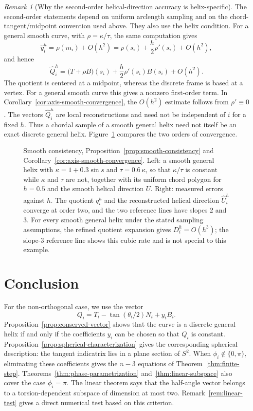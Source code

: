 \documentclass[10pt,a4paper]{amsart}
\theoremstyle{definition}
\theoremstyle{remark}
\newtheorem{remark}[theorem]{Remark}
\numberwithin{equation}{section}
\begin{document}
\begin{remark}[Why the second-order helical-direction accuracy is helix-specific]\label{rem:axis-order}
The second-order statements depend on uniform arclength sampling and on
the chord-tangent/midpoint convention used above. They also use the helix condition. For a general smooth curve, with $\rho=\kappa/\tau$, the same computation gives
\[
\widehat y_i^h=\rho(m_i)+O(h^2)
=\rho(s_i)+\frac h2\rho'(s_i)+O(h^2),
\]
and hence
\[
\widehat Q_i^h
=\bigl(T+\rho B\bigr)(s_i)
+\frac h2\rho'(s_i)B(s_i)+O(h^2).
\]
The quotient is centered at a midpoint, whereas the discrete frame is based at a vertex. For a general smooth curve this gives a nonzero first-order term. In Corollary~\ref{cor:axis-smooth-convergence}, the $O(h^2)$ estimate follows from $\rho'\equiv0$. The vectors $\widehat Q_i^h$ are local reconstructions and need not be independent of $i$ for a fixed $h$. Thus a chordal sample of a smooth general helix need not itself be an exact discrete general helix. Figure~\ref{fig:smooth-consistency} compares the two orders of convergence.
\end{remark}

\begin{figure}[!ht]
\centering
\resizebox{0.98\textwidth}{!}{}
\caption{Smooth consistency, Proposition~\ref{prop:smooth-consistency} and Corollary~\ref{cor:axis-smooth-convergence}. Left: a smooth general helix with $\kappa=1+0.3\sin s$ and $\tau=0.6\,\kappa$, so that $\kappa/\tau$ is constant while $\kappa$ and $\tau$ are not, together with its uniform chord polygon for $h=0.5$ and the smooth helical direction $U$. Right: measured errors against $h$. The quotient $q_i^h$ and the reconstructed helical direction $\widehat U_i^h$ converge at order two, and the two reference lines have slopes $2$ and $3$. For every smooth general helix under the stated sampling assumptions, the refined quotient expansion gives $D_i^h=O(h^3)$; the slope-$3$ reference line shows this cubic rate and is not special to this example.}
\label{fig:smooth-consistency}
\end{figure}



\section{Conclusion}

For the non-orthogonal case, we use the vector
\[
Q_i=T_i-\tan(\theta_i/2)N_i+y_iB_i.
\]
Proposition~\ref{prop:conserved-vector} shows that the curve is a discrete general helix if and only if the coefficients $y_i$ can be chosen so that $Q_i$ is constant. Proposition~\ref{prop:spherical-characterization} gives the corresponding spherical description: the tangent indicatrix lies in a plane section of $S^2$. When $\phi_i\notin\{0,\pi\}$, eliminating these coefficients gives the $n-3$ equations of Theorem~\ref{thm:finite-step}. Theorems~\ref{thm:phase-parametrization} and~\ref{thm:linear-subspace} also cover the case $\phi_i=\pi$. The linear theorem says that the half-angle vector belongs to a torsion-dependent subspace of dimension at most two. Remark~\ref{rem:linear-test} gives a direct numerical test based on this criterion.
\end{document}
